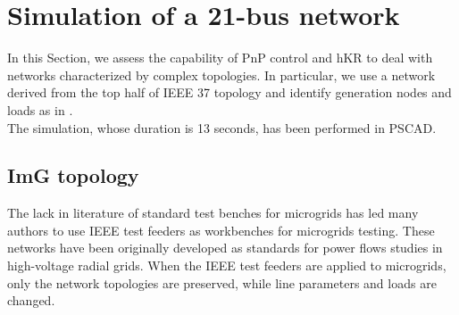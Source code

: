 \documentclass[a4paper]{article}
\theoremstyle{plain}
\begin{document}
	\section{Simulation of a 21-bus network}
          \label{sec:Sim21bn}
In this Section, we assess the capability of PnP control and hKR to deal with networks characterized by
complex topologies. In particular, we use a network derived from the
top half of IEEE 37 topology \cite{feeders2011ieee} and identify generation nodes and
loads as in \cite{bolognani2013distributed}.\\
The simulation, whose duration is 13 seconds, has been performed
in PSCAD.

	\subsection{ImG topology}
	The lack in literature of standard test benches for microgrids has led many authors to use IEEE test feeders \cite{feeders2011ieee} as workbenches for microgrids testing. These networks have been originally developed as standards for power flows studies in high-voltage radial grids. When the IEEE test feeders are applied to microgrids, only the network topologies are preserved, while line parameters and loads are changed. 
\end{document}
